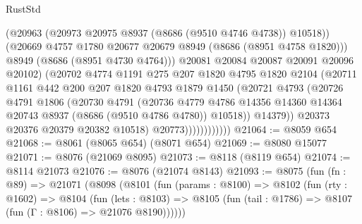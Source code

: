\begin{lexlean}{RustStd}
\begin{coremodule}
                              (@20963 (@20973 @20975 @8937 (@8686 (@9510 @4746 @4738)) @10518))
                              (@20669 @4757 @1780 @20677 @20679 @8949 (@8686 (@8951 @4758 @1820)))
                              @8949
                              (@8686 (@8951 @4730 @4764)))
                            @20081
                            @20084
                            @20087
                            @20091
                            @20096
                            @20102)
                          (@20702
                            @4774
                            @1191
                            @275
                            @207
                            @1820
                            @4795
                            @1820
                            @2104
                            (@20711
                              @1161
                              @442
                              @200
                              @207
                              @1820
                              @4793
                              @1879
                              @1450
                              (@20721
                                @4793
                                (@20726
                                  @4791
                                  @1806
                                  (@20730
                                    @4791
                                    (@20736
                                      @4779
                                      @4786
                                      @14356
                                      @14360
                                      @14364
                                      @20743
                                      @8937
                                      (@8686 (@9510 @4786 @4780))
                                      @10518))
                                  @14379))
                              @20373
                              @20376
                              @20379
                              @20382
                              @10518)
                            @20773))))))))))))
@21064 := @8059 @654
@21068 := @8061 (@8065 @654) (@8071 @654)
@21069 := @8080 @15077
@21071 := @8076 (@21069 @8095)
@21073 := @8118 (@8119 @654)
@21074 := @8114 @21073
@21076 := @8076 (@21074 @8143)
@21093 := @8075
    (fun (fn : @89) =>
    @21071
      (@8098
        (@8101
          (fun (params : @8100) =>
          @8102
            (fun (rty : @1602) =>
            @8104
              (fun (lets : @8103) =>
              @8105 (fun (tail : @1786) => @8107 (fun (Γ : @8106) => @21076 @8190))))))

\end{coremodule}
\end{lexlean}
